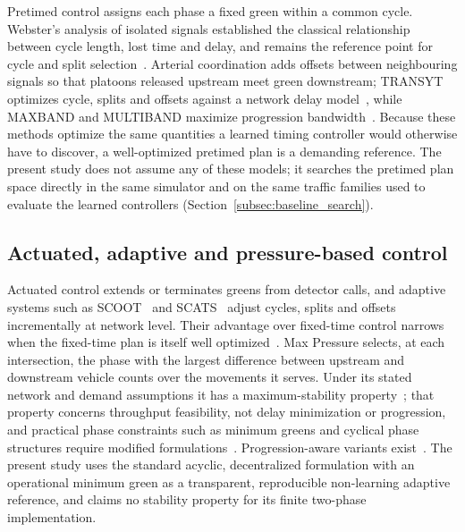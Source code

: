 \documentclass[review,12pt]{elsarticle}
\begin{document}
Pretimed control assigns each phase a fixed green within a common cycle.
Webster's analysis of isolated signals established the classical
relationship between cycle length, lost time and delay, and remains the
reference point for cycle and split selection~\cite{webster1958}.
Arterial coordination adds offsets between neighbouring signals so that
platoons released upstream meet green downstream; TRANSYT optimizes
cycle, splits and offsets against a network delay model~\cite{robertson1969transyt},
while MAXBAND and MULTIBAND maximize progression
bandwidth~\cite{little1981maxband,gartner1990multiband,jingquanli2014}.
Because these methods optimize the same quantities a learned timing
controller would otherwise have to discover, a well-optimized pretimed
plan is a demanding reference. The present study does not assume any of
these models; it searches the pretimed plan space directly in the same
simulator and on the same traffic families used to evaluate the
learned controllers (Section~\ref{subsec:baseline_search}).

\subsection{Actuated, adaptive and pressure-based control}
\label{subsec:lit_adaptive}

Actuated control extends or terminates greens from detector calls, and
adaptive systems such as SCOOT~\cite{hunt1981traffic} and
SCATS~\cite{sims1980scoot} adjust cycles, splits and offsets
incrementally at network level. Their advantage over fixed-time control
narrows when the fixed-time plan is itself well
optimized~\cite{cameronkergaye2010}. Max Pressure selects, at each
intersection, the phase with the largest difference between upstream
and downstream vehicle counts over the movements it serves. Under its
stated network and demand assumptions it has a maximum-stability
property~\cite{varaiya2013max}; that property concerns throughput
feasibility, not delay minimization or progression, and practical phase
constraints such as minimum greens and cyclical phase structures require
modified formulations~\cite{levin2020max}. Progression-aware
variants exist~\cite{ahmed2025cmp}. The present study uses the
standard acyclic, decentralized formulation with an operational minimum
green as a transparent, reproducible non-learning adaptive reference,
and claims no stability property for its finite two-phase
implementation.
\end{document}
